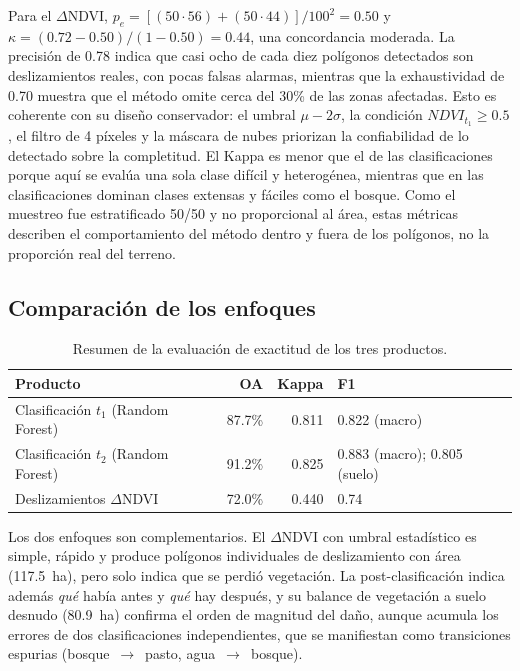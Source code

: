 \documentclass[12pt]{article}
\begin{document}
Para el $\Delta$NDVI, $p_e = [(50 \cdot 56) + (50 \cdot 44)]/100^2 = 0.50$ y $\kappa = (0.72 - 0.50)/(1 - 0.50) = 0.44$, una concordancia moderada. La precisión de 0.78 indica que casi ocho de cada diez polígonos detectados son deslizamientos reales, con pocas falsas alarmas, mientras que la exhaustividad de 0.70 muestra que el método omite cerca del 30\% de las zonas afectadas. Esto es coherente con su diseño conservador: el umbral $\mu - 2\sigma$, la condición $NDVI_{t_1} \geq 0.5$, el filtro de 4 píxeles y la máscara de nubes priorizan la confiabilidad de lo detectado sobre la completitud. El Kappa es menor que el de las clasificaciones porque aquí se evalúa una sola clase difícil y heterogénea, mientras que en las clasificaciones dominan clases extensas y fáciles como el bosque. Como el muestreo fue estratificado 50/50 y no proporcional al área, estas métricas describen el comportamiento del método dentro y fuera de los polígonos, no la proporción real del terreno.

\subsection{Comparación de los enfoques}
\begin{table}[H]
    \centering
    \caption{Resumen de la evaluación de exactitud de los tres productos.}
    \label{tab:resumen_acc}
    \begin{tabular}{lrrl}
        \toprule
        \textbf{Producto} & \textbf{OA} & \textbf{Kappa} & \textbf{F1} \\
        \midrule
        Clasificación $t_1$ (Random Forest) & 87.7\% & 0.811 & 0.822 (macro) \\
        Clasificación $t_2$ (Random Forest) & 91.2\% & 0.825 & 0.883 (macro); 0.805 (suelo) \\
        Deslizamientos $\Delta$NDVI & 72.0\% & 0.440 & 0.74 \\
        \bottomrule
    \end{tabular}
\end{table}

Los dos enfoques son complementarios. El $\Delta$NDVI con umbral estadístico es simple, rápido y produce polígonos individuales de deslizamiento con área (117.5~ha), pero solo indica que se perdió vegetación. La post-clasificación indica además \emph{qué} había antes y \emph{qué} hay después, y su balance de vegetación a suelo desnudo (80.9~ha) confirma el orden de magnitud del daño, aunque acumula los errores de dos clasificaciones independientes, que se manifiestan como transiciones espurias (bosque~$\rightarrow$~pasto, agua~$\rightarrow$~bosque).
\end{document}
